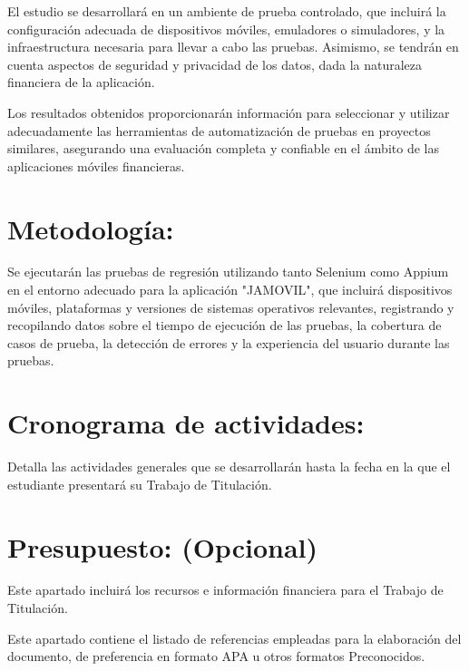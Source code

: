 \documentclass{article}
\begin{document}
El estudio se desarrollará en un ambiente de prueba controlado, que incluirá la configuración adecuada de dispositivos móviles, emuladores o simuladores, y la infraestructura necesaria para llevar a cabo las pruebas. Asimismo, se tendrán en cuenta aspectos de seguridad y privacidad de los datos, dada la naturaleza financiera de la aplicación.

Los resultados obtenidos proporcionarán información para seleccionar y utilizar adecuadamente las herramientas de automatización de pruebas en proyectos similares, asegurando una evaluación completa y confiable en el ámbito de las aplicaciones móviles financieras.


\section{Metodología:}

Se ejecutarán las pruebas de regresión utilizando tanto Selenium como Appium en el entorno  adecuado para la aplicación "JAMOVIL", que incluirá dispositivos móviles, plataformas y versiones de sistemas operativos relevantes, registrando y recopilando datos sobre el tiempo de ejecución de las pruebas, la cobertura de casos de prueba, la detección de errores y la experiencia del usuario durante las pruebas.


\section{Cronograma de actividades:}
Detalla las actividades generales que se desarrollarán hasta la fecha en la que el estudiante presentará su Trabajo de Titulación. 

\section{Presupuesto: (Opcional)}

Este apartado incluirá los recursos e información financiera para el Trabajo de Titulación. 






\vspace{1cm}
Este apartado contiene el listado de referencias empleadas para la elaboración del documento, de preferencia en formato APA u otros formatos Preconocidos.
\end{document}
